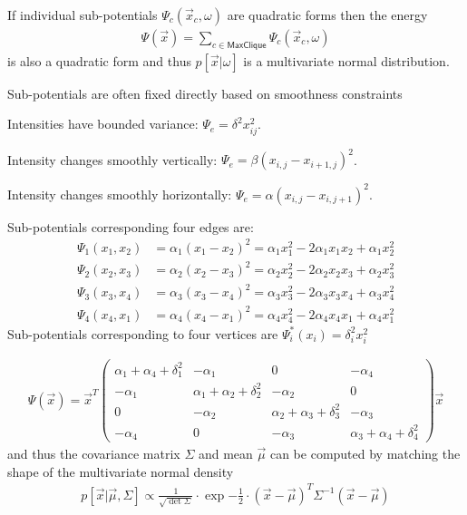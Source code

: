 \documentclass[landscape,footrule]{foils}
\begin{document}

If individual sub-potentials $\Psi_c(\vec{x}_c,\omega)$ are quadratic forms then the energy 
\begin{align*}
\Psi(\vec{x})=\sum_{c\in\textsf{MaxClique}}\Psi_c(\vec{x}_c,\omega) 
\end{align*} 
is also a quadratic form and thus $p[\vec{x}|\omega]$ is a multivariate normal distribution.\vspace*{1cm}

Sub-potentials are often fixed directly based on smoothness constraints
\begin{triangles}
\item Intensities have bounded variance: $\Psi_e=\delta^2 x_{ij}^2$. 
\item Intensity changes smoothly vertically: $\Psi_e=\beta(x_{i,j}-x_{i+1,j})^2$.
\item Intensity changes smoothly horizontally: $\Psi_e=\alpha(x_{i,j}-x_{i,j+1})^2$.
\end{triangles} 


\vspace*{-0.6cm}

Sub-potentials corresponding four edges are:  
\begin{align*}
\Psi_1(x_1,x_2)&= \alpha_1(x_{1}-x_2)^2=\alpha_1 x_1^2-2\alpha_1 x_1x_2+\alpha_1 x_2^2\\
\Psi_2(x_2,x_3)&= \alpha_2(x_{2}-x_3)^2=\alpha_2 x_2^2-2\alpha_2 x_2x_3+\alpha_2 x_3^2\\
\Psi_3(x_3,x_4)&= \alpha_3(x_{3}-x_4)^2=\alpha_3 x_3^2-2\alpha_3 x_3x_4+\alpha_3 x_4^2\\
\Psi_4(x_4,x_1)&= \alpha_4(x_{4}-x_1)^2=\alpha_4 x_4^2-2\alpha_4 x_4x_1+\alpha_4 x_1^2
\end{align*}
Sub-potentials corresponding to four vertices are $\Psi_i^*(x_i)=\delta_i^2 x_i^2$ 


\begin{align*}
\Psi(\vec{x})=\vec{x}^T
\begin{pmatrix}
\alpha_1+\alpha_4+\delta_1^2 & -\alpha_1 & 0 & -\alpha_4\\
-\alpha_1 &\alpha_1+\alpha_2+\delta_2^2 & -\alpha_2 & 0 \\
0 &-\alpha_2 &\alpha_2+\alpha_3+\delta_3^2 & -\alpha_3 \\
-\alpha_4 & 0 &-\alpha_3 &\alpha_3+\alpha_4+\delta_4^2 
\end{pmatrix}
\vec{x}
\end{align*}
and thus the covariance matrix $\Sigma$ and mean $\vec{\mu}$ can be computed by matching the shape of the multivariate normal density
\begin{align*}
p[\vec{x}|\vec{\mu},\Sigma]\propto\frac{1}{\sqrt{\det\Sigma}}\cdot\exp{-\frac{1}{2}\cdot 
(\vec{x}-\vec{\mu})^T\Sigma^{-1}(\vec{x}-\vec{\mu})}
\end{align*}
\end{document}
